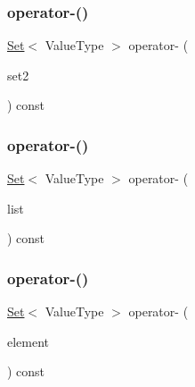 \mbox{\label{classSet_a43f16ff49c06f1b5c005d7da94438613}} 
\subsubsection{\texorpdfstring{operator-\/()}{operator-()}\hspace{0.1cm}{\footnotesize\ttfamily [1/3]}}
{\footnotesize\ttfamily \mbox{\hyperlink{classSet}{Set}}$<$ Value\+Type $>$ operator-\/ (\begin{DoxyParamCaption}\item[{const \mbox{\hyperlink{classSet}{Set}}$<$ Value\+Type $>$ \&}]{set2 }\end{DoxyParamCaption}) const}

\mbox{\label{classSet_a49469b442bd79d701ec74be9cd886db8}} 
\subsubsection{\texorpdfstring{operator-\/()}{operator-()}\hspace{0.1cm}{\footnotesize\ttfamily [2/3]}}
{\footnotesize\ttfamily \mbox{\hyperlink{classSet}{Set}}$<$ Value\+Type $>$ operator-\/ (\begin{DoxyParamCaption}\item[{std\+::initializer\+\_\+list$<$ Value\+Type $>$}]{list }\end{DoxyParamCaption}) const}

\mbox{\label{classSet_a7a14be608a97119c6e22bf317f442d8a}} 
\subsubsection{\texorpdfstring{operator-\/()}{operator-()}\hspace{0.1cm}{\footnotesize\ttfamily [3/3]}}
{\footnotesize\ttfamily \mbox{\hyperlink{classSet}{Set}}$<$ Value\+Type $>$ operator-\/ (\begin{DoxyParamCaption}\item[{const Value\+Type \&}]{element }\end{DoxyParamCaption}) const}

